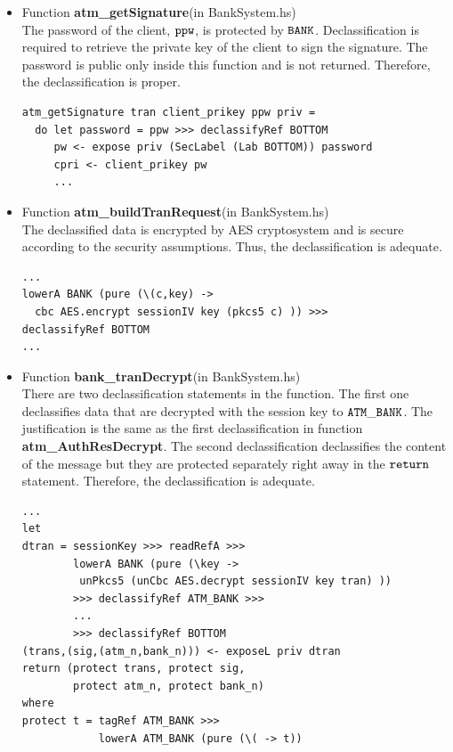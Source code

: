 \documentclass[a4paper]{report}
\newcommand{\co}[1]{$\cod{#1}$}
\begin{document}
\begin{itemize}
\item Function \textbf{atm\_getSignature}(in BankSystem.hs) \\
      The password of the client, \co{ppw}, is protected by \co{BANK}. 
      Declassification is required to retrieve the private key
      of the client to sign the signature. The password is public only inside this function and
      is not returned. Therefore, the declassification is proper.
\begin{Verbatim}[fontsize=\footnotesize]
atm_getSignature tran client_prikey ppw priv =
  do let password = ppw >>> declassifyRef BOTTOM
     pw <- expose priv (SecLabel (Lab BOTTOM)) password
     cpri <- client_prikey pw
     ...
\end{Verbatim}

\item Function \textbf{atm\_buildTranRequest}(in BankSystem.hs) \\
      The declassified data is encrypted by AES cryptosystem and is secure according to
      the security assumptions. Thus, the declassification is adequate.
\begin{Verbatim}[fontsize=\footnotesize]
...
lowerA BANK (pure (\(c,key) -> 
  cbc AES.encrypt sessionIV key (pkcs5 c) )) >>>
declassifyRef BOTTOM
...
\end{Verbatim}

\item Function \textbf{bank\_tranDecrypt}(in BankSystem.hs) \\
      There are two declassification statements in the function. The first one declassifies data that are decrypted with
      the session key to \co{ATM\_BANK}. The justification is the same as the first declassification in function
      \textbf{atm\_AuthResDecrypt}. The second declassification declassifies the content of the message but
      they are protected separately right away in the \co{return} statement. Therefore, the declassification
      is adequate.
\begin{Verbatim}[fontsize=\footnotesize]
...
let 
dtran = sessionKey >>> readRefA >>>
        lowerA BANK (pure (\key -> 
         unPkcs5 (unCbc AES.decrypt sessionIV key tran) ))
        >>> declassifyRef ATM_BANK >>>
        ...
        >>> declassifyRef BOTTOM
(trans,(sig,(atm_n,bank_n))) <- exposeL priv dtran
return (protect trans, protect sig, 
        protect atm_n, protect bank_n)
where
protect t = tagRef ATM_BANK >>> 
            lowerA ATM_BANK (pure (\( -> t))
\end{Verbatim}


\end{itemize}
\end{document}
